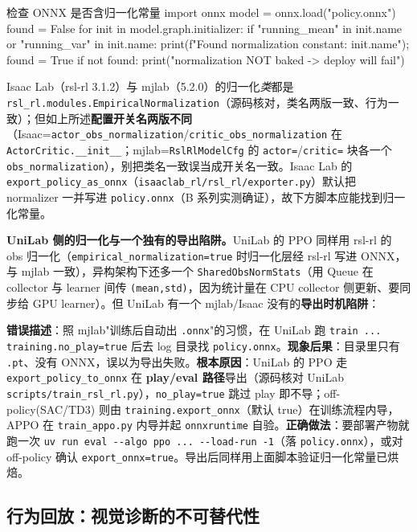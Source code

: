 \begin{codebox}[Python]{检查 ONNX 是否含归一化常量}
import onnx
model = onnx.load("policy.onnx")
found = False
for init in model.graph.initializer:
    if "running_mean" in init.name or "running_var" in init.name:
        print(f"Found normalization constant: {init.name}"); found = True
if not found:
    print("normalization NOT baked -> deploy will fail")
\end{codebox}

Isaac Lab（rsl-rl 3.1.2）与 mjlab（5.2.0）的归一化\emph{类}都是 \verb|rsl_rl.modules.EmpiricalNormalization|（源码核对，类名两版一致、行为一致）；但如上所述\textbf{配置开关名两版不同}（Isaac=\verb|actor_obs_normalization|/\verb|critic_obs_normalization| 在 \verb|ActorCritic.__init__|；mjlab=\verb|RslRlModelCfg| 的 \verb|actor=|/\verb|critic=| 块各一个 \verb|obs_normalization|），别把类名一致误当成开关名一致。Isaac Lab 的 \verb|export_policy_as_onnx|（\verb|isaaclab_rl/rsl_rl/exporter.py|）默认把 normalizer 一并写进 \verb|policy.onnx|（B 系列实测确证），故下方脚本应能找到归一化常量。

\textbf{UniLab 侧的归一化与一个独有的导出陷阱。}UniLab 的 PPO 同样用 rsl-rl 的 obs 归一化（\verb|empirical_normalization=true| 时归一化层经 rsl-rl 写进 ONNX，与 mjlab 一致），异构架构下还多一个 \verb|SharedObsNormStats|（用 Queue 在 collector 与 learner 间传 \verb|(mean,std)|，因为统计量在 CPU collector 侧更新、要同步给 GPU learner）。但 UniLab 有一个 mjlab/Isaac 没有的\textbf{导出时机陷阱}：

\begin{pitfall}[UniLab PPO 在 play/eval 阶段才导 ONNX，训练时加 \texttt{no\_play=true} 会拿不到部署产物]
\textbf{错误描述}：照 mjlab"训练后自动出 \verb|.onnx|"的习惯，在 UniLab 跑 \verb|train ... training.no_play=true| 后去 log 目录找 \verb|policy.onnx|。\textbf{现象后果}：目录里只有 \verb|.pt|、没有 ONNX，误以为导出失败。\textbf{根本原因}：UniLab 的 PPO 走 \verb|export_policy_to_onnx| 在 \textbf{play/eval 路径}导出（源码核对 UniLab \verb|scripts/train_rsl_rl.py|），\verb|no_play=true| 跳过 play 即不导；off-policy(SAC/TD3) 则由 \verb|training.export_onnx|（默认 true）在训练流程内导，APPO 在 \verb|train_appo.py| 内导并起 \verb|onnxruntime| 自验。\textbf{正确做法}：要部署产物就跑一次 \verb|uv run eval --algo ppo ... --load-run -1|（落 \verb|policy.onnx|），或对 off-policy 确认 \verb|export_onnx=true|。导出后同样用上面脚本验证归一化常量已烘焙。
\end{pitfall}

\subsection{行为回放：视觉诊断的不可替代性}

